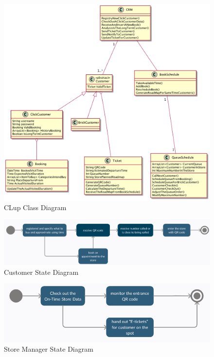\documentclass[a4paper,12pt]{report}
\begin{document}
\begin{figure}[H] 
	\centering
	\includegraphics[scale=0.28]{class_diagram.png}
	\caption{CLup Class Diagram}
	\label{Class Diagram}
\end{figure}

\begin{figure}[H]   
	\includegraphics[scale=0.3]{State_diagram1.png}
	\caption{Customer State Diagram}
	\centering
	\label{State Diagram 1}
\end{figure}

\begin{figure}[H] 
	\includegraphics[scale=0.3]{State_diagram2.png}
	\caption{Store Manager State Diagram}
	\centering
	\label{State Diagram 2}
\end{figure}
\end{document}
